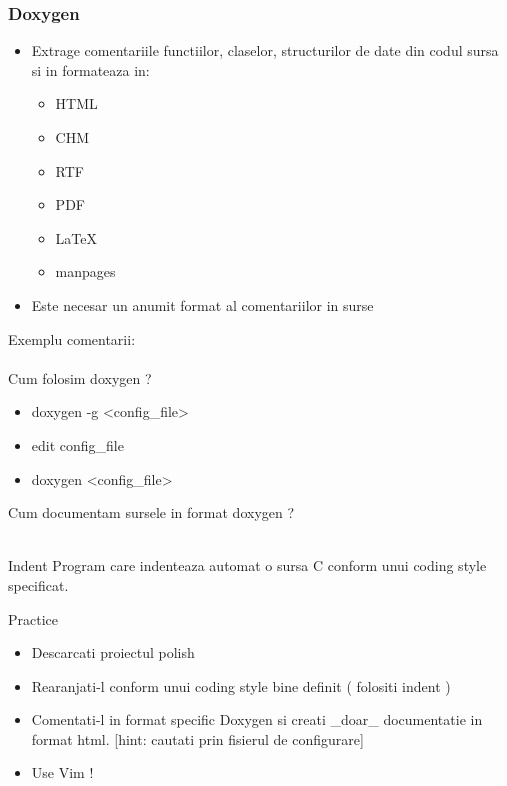 \documentclass{beamer}
\begin{document}
  \begin{frame}[allowframebreaks]
  \frametitle{Doxygen}
  \begin{itemize}
  \item Extrage comentariile functiilor, claselor, structurilor de date din codul sursa si in formateaza in:\\ \begin{itemize} \item HTML \item CHM \item RTF \item PDF \item LaTeX \item manpages \end{itemize}
  \item Este necesar un anumit format al comentariilor in surse
  \end{itemize}
  \framebreak
  Exemplu comentarii:\\ 
  \\ Cum folosim doxygen ? \\
  \begin{itemize}
  \item {\ttfamily doxygen -g <config\_file>}
  \item edit config\_file
  \item {\ttfamily doxygen <config\_file>} 
  \end{itemize}
  \framebreak
  Cum documentam sursele in format doxygen ? \\ 
  \vspace{0.5cm} 
   \\
  \framebreak
  
  \end{frame}

  \begin{frame}{Indent}
  Program care indenteaza automat o sursa C conform unui coding style specificat.
  \end{frame}

  \begin{frame}{Practice}
  \begin{itemize}
  \setlength{\itemsep}{0.5cm}
  \item Descarcati proiectul polish
  \item Rearanjati-l conform unui coding style bine definit ( folositi indent )
  \item Comentati-l in format specific Doxygen si creati \_doar\_ documentatie in format html. [hint: cautati prin fisierul de configurare]
  \item Use Vim !
  \end{itemize}
  \end{frame}
\end{document}
